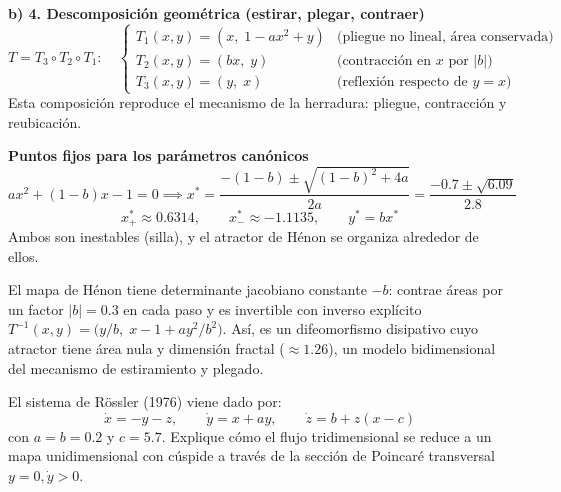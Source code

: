 \documentclass[11pt,a4paper]{article}
\newenvironment{solucion}[1][Solución Detallada]{%
    \vspace{1.5mm}%
    \noindent{\large\textbf{Solución:}}\par\vspace{1.5mm}%
}{%
    \par\vspace{3mm}%
}
\newenvironment{conclusion}[1][Interpretación Dinámica y Conclusión]{%
    \vspace{2mm}%
    \noindent{\large\textbf{Conclusión:}}\par\vspace{1.5mm}%
}{%
    \par\vspace{3mm}%
}
\begin{document}
\begin{solucion}
\vspace{3.5mm}

\textbf{\large b) 4. Descomposición geométrica (estirar, plegar, contraer)}
\[
T = T_3 \circ T_2 \circ T_1: \quad
\begin{cases}
T_1(x,y) = (x,\; 1 - a x^2 + y) & \text{(pliegue no lineal, área conservada)} \\
T_2(x,y) = (b x,\; y) & \text{(contracción en } x \text{ por } |b|\text{)} \\
T_3(x,y) = (y,\; x) & \text{(reflexión respecto de } y = x\text{)}
\end{cases}
\]
Esta composición reproduce el mecanismo de la herradura: pliegue, contracción y reubicación.

\vspace{3.5mm}

\textbf{\large Puntos fijos para los parámetros canónicos}
\[
a x^2 + (1 - b)x - 1 = 0 \implies x^* = \frac{-(1-b) \pm \sqrt{(1-b)^2 + 4a}}{2a} = \frac{-0.7 \pm \sqrt{6.09}}{2.8}
\]
\[
x^*_{+} \approx 0.6314, \qquad x^*_{-} \approx -1.1135, \qquad y^* = b x^*
\]
Ambos son inestables (silla), y el atractor de Hénon se organiza alrededor de ellos.

\end{solucion}

\begin{conclusion}
El mapa de Hénon tiene determinante jacobiano constante $-b$: contrae áreas por un factor $|b| = 0.3$ en cada paso y es invertible con inverso explícito $T^{-1}(x,y) = \bigl(y/b,\; x - 1 + a y^2/b^2\bigr)$. Así, es un difeomorfismo disipativo cuyo atractor tiene área nula y dimensión fractal ($\approx 1.26$), un modelo bidimensional del mecanismo de estiramiento y plegado.
\end{conclusion}

\vspace{3mm}

\begin{problema}[Problema 5.4]
El sistema de Rössler (1976) viene dado por:
\[
\dot{x} = -y - z, \qquad \dot{y} = x + a y, \qquad \dot{z} = b + z(x - c)
\]
con $a = b = 0.2$ y $c = 5.7$.
Explique cómo el flujo tridimensional se reduce a un mapa unidimensional con cúspide a través de la sección de Poincaré transversal $y = 0, \dot{y} > 0$.
\end{problema}
\end{document}
